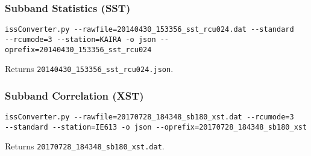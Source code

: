 \documentclass[10pt,a4paper]{article}
\begin{document}
\subsubsection{Subband Statistics (SST)}

\begin{verbatim}
issConverter.py --rawfile=20140430_153356_sst_rcu024.dat --standard
--rcumode=3 --station=KAIRA -o json --oprefix=20140430_153356_sst_rcu024
\end{verbatim}

\noindent Returns \texttt{20140430\_153356\_sst\_rcu024.json}.

\subsubsection{Subband Correlation (XST)}

\begin{verbatim}
issConverter.py --rawfile=20170728_184348_sb180_xst.dat --rcumode=3
--standard --station=IE613 -o json --oprefix=20170728_184348_sb180_xst
\end{verbatim}

\noindent Returns \texttt{20170728\_184348\_sb180\_xst.dat}.



\end{document}
